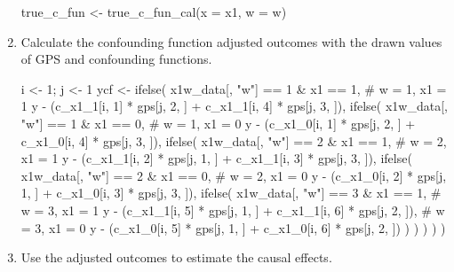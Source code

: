 \begin{enumerate}
\begin{Schunk}
\begin{Sinput}
true_c_fun <- true_c_fun_cal(x = x1, w = w)
\end{Sinput}
\end{Schunk}

\item Calculate the confounding function adjusted outcomes with the drawn values of GPS and  confounding functions.

\begin{Schunk}
\begin{Sinput}
i <- 1; j <- 1
ycf <- ifelse(
  x1w_data[, "w"] == 1 & x1 == 1,
  # w = 1, x1 = 1
  y - (c_x1_1[i, 1] * gps[j, 2, ] + c_x1_1[i, 4] * gps[j, 3, ]),
  ifelse(
    x1w_data[, "w"] == 1 & x1 == 0,
    # w = 1, x1 = 0
    y - (c_x1_0[i, 1] * gps[j, 2, ] + c_x1_0[i, 4] * gps[j, 3, ]),
    ifelse(
      x1w_data[, "w"] == 2 & x1 == 1,
      # w = 2, x1 = 1
      y - (c_x1_1[i, 2] * gps[j, 1, ] + c_x1_1[i, 3] * gps[j, 3, ]),
      ifelse(
        x1w_data[, "w"] == 2 & x1 == 0,
        # w = 2, x1 = 0
        y - (c_x1_0[i, 2] * gps[j, 1, ] + c_x1_0[i, 3] * gps[j, 3, ]),
        ifelse(
          x1w_data[, "w"] == 3 & x1 == 1,
          # w = 3, x1 = 1
          y - (c_x1_1[i, 5] * gps[j, 1, ] + c_x1_1[i, 6] * gps[j, 2, ]),
          # w = 3, x1 = 0
          y - (c_x1_0[i, 5] * gps[j, 1, ] + c_x1_0[i, 6] * gps[j, 2, ])
        )
      )
    )
  )
) 
\end{Sinput}
\end{Schunk}

\item Use the adjusted outcomes to estimate the causal effects.


\end{enumerate}

